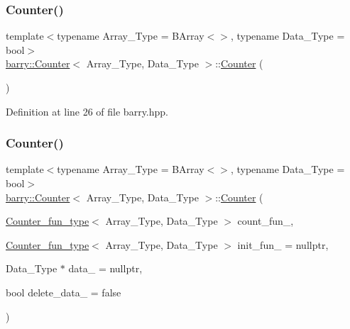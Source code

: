 \subsubsection{\texorpdfstring{Counter()}{Counter()}\hspace{0.1cm}{\footnotesize\ttfamily [1/3]}}
{\footnotesize\ttfamily template$<$typename Array\+\_\+\+Type  = B\+Array$<$$>$, typename Data\+\_\+\+Type  = bool$>$ \\
\hyperlink{classbarry_1_1_counter}{barry\+::\+Counter}$<$ Array\+\_\+\+Type, Data\+\_\+\+Type $>$\+::\hyperlink{classbarry_1_1_counter}{Counter} (\begin{DoxyParamCaption}{ }\end{DoxyParamCaption})\hspace{0.3cm}{\ttfamily [inline]}}



Definition at line 26 of file barry.\+hpp.

\mbox{\label{classbarry_1_1_counter_a1e886197c8f42b2552ada2786726fa38}} 
\subsubsection{\texorpdfstring{Counter()}{Counter()}\hspace{0.1cm}{\footnotesize\ttfamily [2/3]}}
{\footnotesize\ttfamily template$<$typename Array\+\_\+\+Type  = B\+Array$<$$>$, typename Data\+\_\+\+Type  = bool$>$ \\
\hyperlink{classbarry_1_1_counter}{barry\+::\+Counter}$<$ Array\+\_\+\+Type, Data\+\_\+\+Type $>$\+::\hyperlink{classbarry_1_1_counter}{Counter} (\begin{DoxyParamCaption}\item[{\hyperlink{namespacebarry_abaaae3200da8e4b7faac3c04fe9c3081}{Counter\+\_\+fun\+\_\+type}$<$ Array\+\_\+\+Type, Data\+\_\+\+Type $>$}]{count\+\_\+fun\+\_\+,  }\item[{\hyperlink{namespacebarry_abaaae3200da8e4b7faac3c04fe9c3081}{Counter\+\_\+fun\+\_\+type}$<$ Array\+\_\+\+Type, Data\+\_\+\+Type $>$}]{init\+\_\+fun\+\_\+ = {\ttfamily nullptr},  }\item[{Data\+\_\+\+Type $\ast$}]{data\+\_\+ = {\ttfamily nullptr},  }\item[{bool}]{delete\+\_\+data\+\_\+ = {\ttfamily false} }\end{DoxyParamCaption})\hspace{0.3cm}{\ttfamily [inline]}}



